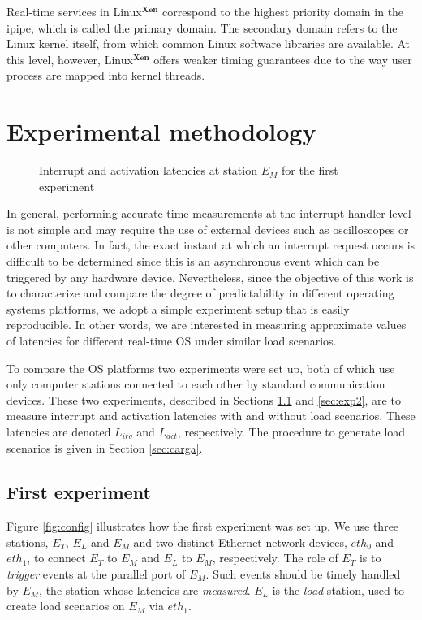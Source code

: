 \documentclass{acm_proc_article-sp}
\begin{document}
Real-time services in Linux$^{\mathbf{Xen}}$ correspond to the highest priority
domain in the ipipe, which is called the primary domain. The secondary domain refers
to the Linux kernel itself, from which common Linux software libraries are
available. At this level, however, Linux$^{\mathbf{Xen}}$ offers weaker timing
guarantees due to the way user process are mapped into kernel threads.

\section{Experimental methodology}
\label{sec:metod}

\begin{figure*}[t]
  \centering {\scalebox{1}{}}
  \caption{Interrupt and activation latencies at station $E_M$ for the
    first experiment}
  \label{fig:dispExp}
\end{figure*}

In general, performing accurate time measurements at the interrupt handler level is
not simple and may require the use of external devices such as oscilloscopes or
other computers. In fact, the exact instant at which an interrupt request occurs is
difficult to be determined since this is an asynchronous event which can be
triggered by any hardware device. Nevertheless, since the objective of this work is
to characterize and compare the degree of predictability in different operating
systems platforms, we adopt a simple experiment setup that is easily reproducible.
In other words, we are interested in measuring approximate values of latencies for
different real-time OS under similar load scenarios.
 
To compare the OS platforms two experiments were set up, both of which use
only computer stations connected to each other by standard communication
devices. These two experiments, described in Sections \ref{sec:exp1} and
\ref{sec:exp2}, are to measure interrupt and activation latencies with and without
load scenarios.  These latencies are denoted $L_{irq}$ and $L_{act}$,
respectively. The procedure to generate load scenarios is given in Section
\ref{sec:carga}.  \newline

\subsection{First experiment}
\label{sec:exp1}

Figure \ref{fig:config} illustrates how the first experiment was set up. We use 
three stations, $E_T$, $E_L$ and $E_M$ and two distinct Ethernet
network devices, $eth_0$ and $eth_1$, to connect $E_T$ to $E_M$ and $E_L$
to $E_M$, respectively. The role of $E_T$ is to \emph{trigger} events at the
parallel port of $E_M$. Such events should be timely handled by $E_M$, the station
whose latencies are \emph{measured}.  $E_L$ is the \emph{load} station, used to
create load scenarios on $E_M$ via $eth_1$.
\end{document}
